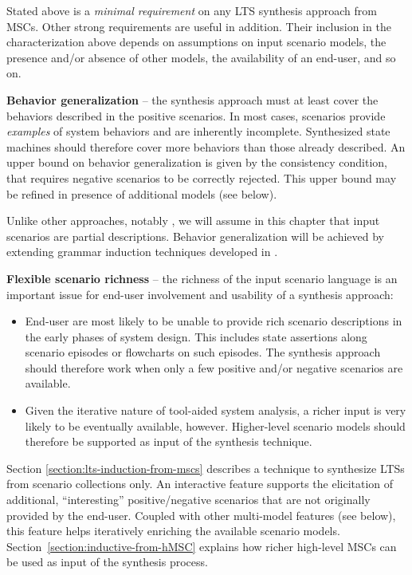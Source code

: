 Stated above is a \emph{minimal requirement} on any LTS synthesis approach from MSCs. Other strong requirements are useful in addition. Their inclusion in the characterization above depends on assumptions on input scenario models, the presence and/or absence of other models, the availability of an end-user, and so on.

\begin{description}

\item{\textbf{Behavior generalization}} -- the synthesis approach must at least cover the behaviors described in the positive scenarios. In most cases, scenarios provide \emph{examples} of system behaviors and are inherently incomplete. Synthesized state machines should therefore cover more behaviors than those already described. An upper bound on behavior generalization is given by the consistency condition, that requires negative scenarios to be correctly rejected. This upper bound may be refined in presence of additional models (see below).

Unlike other approaches, notably \cite{Uchitel:2003}, we will assume in this chapter that input scenarios are partial descriptions. Behavior generalization will be achieved by extending grammar induction techniques developed in \cite{Oncina:1992, Dupont:1996b}.

\item{\textbf{Flexible scenario richness}} -- the richness of the input scenario language is an important issue for end-user involvement and usability of a synthesis approach:

\begin{itemize}
\item End-user are most likely to be unable to provide rich scenario descriptions in the early phases of system design. This includes state assertions along scenario episodes or flowcharts on such episodes. The synthesis approach should therefore work when only a few positive and/or negative scenarios are available.
\item Given the iterative nature of tool-aided system analysis, a richer input is very likely to be eventually available, however. Higher-level scenario models should therefore be supported as input of the synthesis technique. 
\end{itemize}

Section \ref{section:lts-induction-from-mscs} describes a technique to synthesize LTSs from scenario collections only. An interactive feature supports the elicitation of additional, ``interesting'' positive/negative scenarios that are not originally provided by the end-user. Coupled with other multi-model features (see below), this feature helps iteratively enriching the available scenario models. Section~\ref{section:inductive-from-hMSC} explains how richer high-level MSCs can be used as input of the synthesis process.


\end{description}
